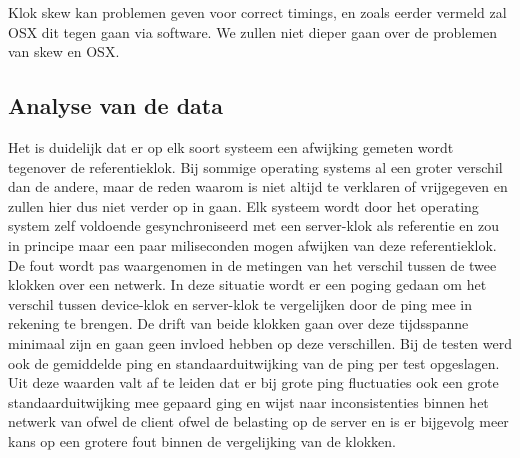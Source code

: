 Klok skew kan problemen geven voor correct timings, en zoals eerder vermeld zal OSX dit tegen gaan via software. We zullen niet dieper gaan over de problemen van skew en OSX. 


\subsection{Analyse van de data}
Het is duidelijk dat er op elk soort systeem een afwijking gemeten wordt tegenover de referentieklok. Bij sommige operating systems al een groter verschil dan de andere, maar de reden waarom is niet altijd te verklaren of vrijgegeven en zullen hier dus niet verder op in gaan. Elk systeem wordt door het operating system zelf voldoende gesynchroniseerd met een server-klok als referentie en zou in principe maar een paar miliseconden mogen afwijken van deze referentieklok. De fout wordt pas waargenomen in de metingen van het verschil tussen de twee klokken over een netwerk. In deze situatie wordt er een poging gedaan om het verschil tussen device-klok en server-klok te vergelijken door de ping mee in rekening te brengen. De drift van beide klokken gaan over deze tijdsspanne minimaal zijn en gaan geen invloed hebben op deze verschillen. Bij de testen werd ook de gemiddelde ping en standaarduitwijking van de ping per test opgeslagen. Uit deze waarden valt af te leiden dat er bij grote ping fluctuaties ook een grote standaarduitwijking mee gepaard ging en wijst naar inconsistenties binnen het netwerk van ofwel de client ofwel de belasting op de server en is er bijgevolg meer kans op een grotere fout binnen de vergelijking van de klokken. 

